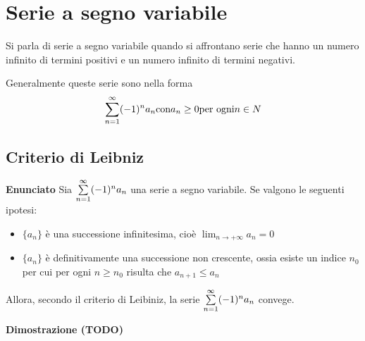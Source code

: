 \section{Serie a segno variabile}

Si parla di serie a segno variabile quando si affrontano serie che hanno un numero infinito di termini positivi e un numero infinito di termini negativi.

Generalmente queste serie sono nella forma $$\sum\limits_{n=1}^{\infty}(-1)^n a_n \text{con} a_n \geq 0 \text{per ogni} n\in N$$

\subsection{Criterio di Leibniz}

\textbf{Enunciato}
Sia $\sum\limits_{n=1}^{\infty}(-1)^n a_n$ una serie a segno variabile. Se valgono le seguenti ipotesi:
\begin{itemize}
\item $\{a_n\}$ è una successione infinitesima, cioè $\lim_{n\to +\infty} a_n=0$
\item $\{a_n\}$ è definitivamente una successione non crescente, ossia esiste un indice $n_0$ per cui per ogni $n \geq n_0$  risulta che $a_{n+1} \leq a_{n}$
\end{itemize}

Allora, secondo il criterio di Leibiniz, la serie $\sum\limits_{n=1}^{\infty}(-1)^n a_n$ convege.

\textbf{Dimostrazione (TODO)}
